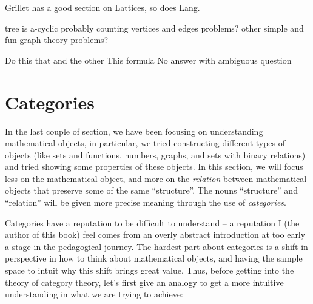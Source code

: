 \documentclass{book}
\begin{document}
Grillet has a good section on Lattices, so does Lang.


\begin{Exercise}[label=graphExercise]
	\Question tree is a-cyclic
	\Question probably counting vertices and edges problems?
	\Question other simple and fun graph theory problems?
\end{Exercise}
\begin{Answer}[ref={graphExercise}]
	\Question Do this that and the other
	\Question This formula
	\Question No answer with ambiguous question \smiley
\end{Answer}
\newpage
\section{Categories}\label{sec:categoriesPrelim}


In the last couple of section, we have been focusing on understanding mathematical objects, in particular, we
tried constructing different types of objects (like sets and functions, numbers, graphs, and sets with binary
relations) and tried showing some properties of these objects. In this section, we will focus less on the
mathematical object, and more on the \emph{relation} between mathematical objects that preserve some of the
same ``structure''. The nouns ``structure'' and ``relation'' will be given more precise meaning through the
use of \emph{categories}.

Categories have a reputation to be difficult to understand -- a reputation I (the author of this book) feel
comes from an overly abstract introduction at too early a stage in the pedagogical journey. The hardest part
about categories is a shift in perspective in how to think about mathematical objects, and having the sample
space to intuit why this shift brings great value. Thus, before getting into the theory of category theory,
let's first give an analogy to get a more intuitive understanding in what we are trying to achieve:
\end{document}
